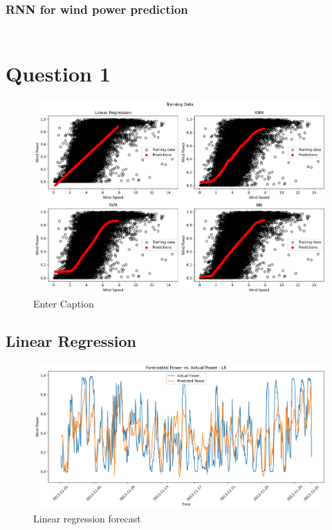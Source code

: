 \documentclass[a4paper, article, oneside, USenglish, IN5460]{memoir}
\begin{document}
\subsection{RNN  for wind power prediction}
\begin{equation}
\begin{aligned}

\end{aligned}
\end{equation}
\newline

\chapter{Question 1}

\begin{figure}[H]
    \centering
    \includegraphics[width=1\linewidth]{fig/q1-ALL-training.png}
    \caption{Enter Caption}
    \label{fig:enter-label}
\end{figure}

\section{Linear Regression}
\begin{figure}[H]
    \centering
    \includegraphics[width=1\linewidth]{fig/q1-LR-forecast.png}
    \caption{Linear regression forecast}
    \label{fig:q1-LR-forecast}
\end{figure}
\end{document}
